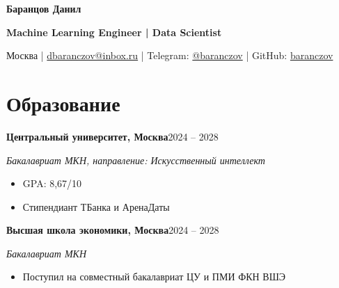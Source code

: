 \documentclass[a4paper,11pt]{article}
\newcommand{\entry}[3]{\textbf{#1}\hfill #3\par\textit{#2}\par}
\begin{document}
\fontsize{10.5}{13}\selectfont
\begin{center}
{\fontsize{14.3}{17}\selectfont\bfseries Баранцов Данил}\par
{\bfseries Machine Learning Engineer | Data Scientist}\par
Москва | \href{mailto:dbaranczov@inbox.ru}{dbaranczov@inbox.ru} |
Telegram: \href{https://t.me/baranczov}{@baranczov} |
GitHub: \href{https://github.com/baranczov}{baranczov}
\end{center}
\vspace{-2pt}
\section*{Образование}
\entry{Центральный университет, Москва}{Бакалавриат МКН, направление: Искусственный интеллект}{2024 -- 2028}
\begin{itemize}
\item GPA: 8,67/10
\item Стипендиант ТБанка и АренаДаты
\end{itemize}
\vspace{3pt}
\entry{Высшая школа экономики, Москва}{Бакалавриат МКН}{2024 -- 2028}
\begin{itemize}
\item Поступил на совместный бакалавриат ЦУ и ПМИ ФКН ВШЭ
\end{itemize}
\begingroup
{}
\end{document}
